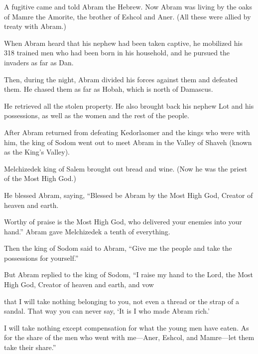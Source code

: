 \begin{scripture}
 A fugitive came and told Abram the Hebrew. Now Abram was living by the oaks of Mamre the Amorite, the brother of Eshcol and Aner. (All these were allied by treaty with Abram.)
 When Abram heard that his nephew had been taken captive, he mobilized his 318 trained men who had been born in his household, and he pursued the invaders as far as Dan.
 Then, during the night, Abram divided his forces against them and defeated them. He chased them as far as Hobah, which is north of Damascus.
 He retrieved all the stolen property. He also brought back his nephew Lot and his possessions, as well as the women and the rest of the people.
\everypar{}

 After Abram returned from defeating Kedorlaomer and the kings who were with him, the king of Sodom went out to meet Abram in the Valley of Shaveh (known as the King's Valley).
 Melchizedek king of Salem brought out bread and wine. (Now he was the priest of the Most High God.)
\everypar{}

 He blessed Abram, saying, ``Blessed be Abram by the Most High God, Creator of heaven and earth.
\everypar{}

 Worthy of praise is the Most High God, who delivered your enemies into your hand.'' Abram gave Melchizedek a tenth of everything.
\everypar{}

 Then the king of Sodom said to Abram, ``Give me the people and take the possessions for yourself.''
 But Abram replied to the king of Sodom, ``I raise my hand to the Lord, the Most High God, Creator of heaven and earth, and vow
 that I will take nothing belonging to you, not even a thread or the strap of a sandal. That way you can never say, `It is I who made Abram rich.'
 I will take nothing except compensation for what the young men have eaten. As for the share of the men who went with me---Aner, Eshcol, and Mamre---let them take their share.''


\end{scripture}
